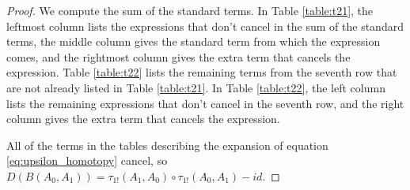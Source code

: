 \begin{proof}
We compute the sum of the standard terms. 
In Table \ref{table:t21}, the leftmost column 
lists the expressions that don't cancel in the 
sum of the standard terms, the middle column 
gives the standard term from which the expression 
comes, and the rightmost column gives the extra 
term that cancels the expression. 
Table \ref{table:t22} lists the remaining terms 
from the seventh row that are not already listed in 
Table \ref{table:t21}. In Table \ref{table:t22}, 
the left column lists the remaining expressions 
that don't cancel in the seventh row, and the 
right column gives the extra term that cancels 
the expression.

All of the terms in the tables describing the 
expansion of equation \ref{eq:upsilon_homotopy} 
cancel, so $D(B(A_0,A_1)) = \tau_{1!}(A_1,A_0)\circ \tau_{1!}(A_0,A_1) - id$.
\end{proof}
%
